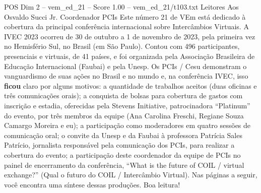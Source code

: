 \begin{textsample}{POS Dim 2 – vem\_ed\_21 – Score 1.00 – vem\_ed\_21/t103.txt}  \label{ex:f2_pos_171}
Leitores Aos Osvaldo Succi Jr.
Coordenador PCIs Este número 21 de VEm está dedicado à cobertura da principal conferência internacional sobre Intercâmbios Virtuais.
A IVEC 2023 ocorreu de 30 de outubro a 1 de novembro de 2023, pela primeira vez no Hemisfério Sul, no Brasil (em São Paulo).
Contou com 496 participantes, presenciais e virtuais, de 41 países, e foi organizada pela Associação Brasileira de Educação Internacional (Faubai) e pela Unesp.
Os PCIs / Cesu demonstram o vanguardismo de suas ações no Brasil e no mundo e, na conferência IVEC, isso \textbf{ficou} claro por alguns motivos: a quantidade de trabalhos aceitos (duas oficinas e três comunicações orais); a conquista de bolsas para cobertura de gastos com inscrição e estadia, oferecidas pela Stevens Initiative, patrocinadora “Platinum” do evento, por três membros da equipe (Ana Carolina Freschi, Regiane Souza Camargo Moreira e eu); a participação como moderadores em quatro sessões de comunicação oral; o convite da Unesp e da Faubai à professora Patrícia Sales Patrício, jornalista responsável pela comunicação dos PCIs, para realizar a cobertura do evento; a participação deste coordenador da equipe de PCIs no painel de encerramento da conferência, “What is the future of COIL / virtual exchange?” (Qual o futuro do COIL / Intercâmbio Virtual).
Nas páginas a seguir, você encontra uma síntese dessas produções.
Boa leitura!

\end{textsample}
